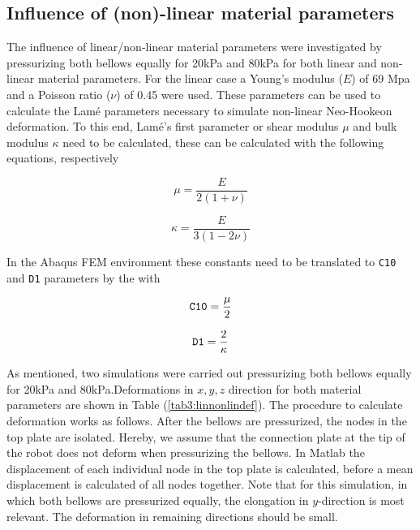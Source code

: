 




\subsection{Influence of (non)-linear material parameters}


The influence of linear/non-linear material parameters were investigated by pressurizing both bellows equally for 20kPa and 80kPa for both linear and non-linear material parameters. For the linear case a Young's modulus ($E$) of 69 Mpa and a Poisson ratio ($\nu$) of 0.45 were used. These parameters can be used to calculate the Lamé parameters necessary to simulate non-linear Neo-Hookeon deformation. To this end, Lamé's first parameter or shear modulus $\mu$ and bulk modulus $\kappa$ need to be calculated, these can be calculated with the following equations, respectively

\begin{equation}
    \mu = \frac{E}{2(1+\nu)}
\end{equation}


\begin{equation}
    \kappa = \frac{E}{3(1-2\nu)}
\end{equation}

In the Abaqus FEM environment these constants need to be translated to \verb+C10+ and \verb+D1+ parameters by the with

\begin{equation}
    \verb+C10+ = \frac{\mu}{2}
\end{equation}


\begin{equation}
    \verb+D1+ = \frac{2}{\kappa}
\end{equation}

As mentioned, two simulations were carried out pressurizing both bellows equally for 20kPa and 80kPa.Deformations in $x,y,z$ direction for both material parameters are shown in Table (\ref{tab3:linnonlindef}). The procedure to calculate deformation works as follows. After the bellows are pressurized, the nodes in the top plate are isolated. Hereby, we assume that the connection plate at the tip of the robot does not deform when pressurizing the bellows. In Matlab the displacement of each individual node in the top plate is calculated, before a mean displacement is calculated of all nodes together. Note that for this simulation, in which both bellows are pressurized equally, the elongation in $y$-direction is most relevant. The deformation in remaining directions should be small.

